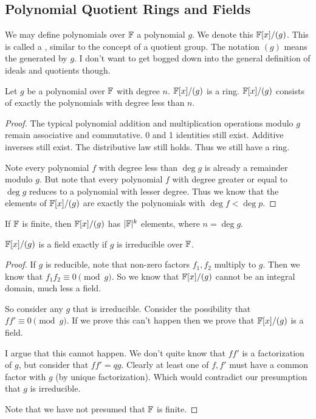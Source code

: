\subsection{Polynomial Quotient Rings and Fields}

\begin{definition}
  We may define polynomials over $\mathbb{F}$  a polynomial $g$.
  We denote this $\mathbb{F}[x]/(g)$. This is called a ,
  similar to the concept of a quotient group. The notation $(g)$ means
  the  generated by $g$. I don't want to get bogged down
  into the general definition of ideals and quotients though.
\end{definition}

\begin{proposition}
  Let $g$ be a polynomial over $\mathbb{F}$ with degree $n$. $\mathbb{F}[x]/(g)$ is a ring.
  $\mathbb{F}[x]/(g)$ consists of exactly the polynomials with degree less than
  $n$.
\end{proposition}

\begin{proof}
  The typical polynomial addition and multiplication operations modulo
  $g$ remain associative and commutative. 0 and 1 identities still
  exist. Additive inverses still exist. The distributive law still
  holds. Thus we still have a ring.

  Note every polynomial $f$ with degree less than $\deg g$ is already a
  remainder modulo $g$. But note that every polynomial $f$ with degree
  greater or equal to $\deg g$ reduces to a polynomial with lesser
  degree. Thus we know that the elements of $\mathbb{F}[x]/(g)$ are exactly the
  polynomials with $\deg f < \deg p$.
\end{proof}

\begin{corollary}
  If $\mathbb{F}$ is finite, then $\mathbb{F}[x]/(g)$ has $|\mathbb{F}|^k$ elements, where $n
  = \deg g$.
\end{corollary}

\begin{proposition}
  $\mathbb{F}[x]/(g)$ is a field exactly if $g$ is irreducible over $\mathbb{F}$.
\end{proposition}

\begin{proof}
  If $g$ is reducible, note that non-zero factors $f_1, f_2$ multiply to
  $g$. Then we know that $f_1 f_2 \equiv 0 \pmod{g}$. So we know that
  $\mathbb{F}[x]/(g)$ cannot be an integral domain, much less a field.

  So consider any $g$ that is irreducible. Consider the possibility that
  $f f' \equiv 0 \pmod{g}$. If we prove this can't happen then we prove
  that $\mathbb{F}[x]/(g)$ is a field.

  I argue that this cannot happen. We don't quite know that $f f'$ is a
  factorization of $g$, but consider that $f f' = qg$. Clearly at least
  one of $f, f'$ must have a common factor with $g$ (by unique
  factorization). Which would contradict our presumption that $g$ is
  irreducible.

  Note that we have not presumed that $\mathbb{F}$ is finite.
\end{proof}

